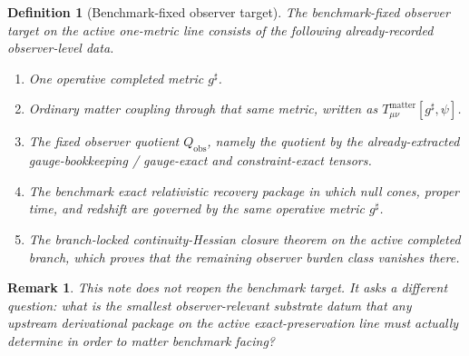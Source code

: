 \documentclass[11pt]{article}
\newcommand{\CompletedMetric}{g^{\sharp}}
\newcommand{\ObserverQuotient}{Q_{\mathrm{obs}}}
\newtheorem{definition}{Definition}
\newtheorem{remark}{Remark}
\begin{document}
\begin{definition}[Benchmark-fixed observer target]
\label{def:target}
The \emph{benchmark-fixed observer target} on the active one-metric line consists of the following already-recorded observer-level data.
\begin{enumerate}
    \item One operative completed metric \(\CompletedMetric\).
    \item Ordinary matter coupling through that same metric, written as \(T_{\mu\nu}^{\mathrm{matter}}[\CompletedMetric,\psi]\).
    \item The fixed observer quotient \(\ObserverQuotient\), namely the quotient by the already-extracted gauge-bookkeeping / gauge-exact and constraint-exact tensors.
    \item The benchmark exact relativistic recovery package in which null cones, proper time, and redshift are governed by the same operative metric \(\CompletedMetric\).
    \item The branch-locked continuity-Hessian closure theorem on the active completed branch, which proves that the remaining observer burden class vanishes there.
\end{enumerate}
\end{definition}

\begin{remark}
This note does not reopen the benchmark target. It asks a different question: what is the smallest observer-relevant substrate datum that any upstream derivational package on the active exact-preservation line must actually determine in order to matter benchmark facing?
\end{remark}
\end{document}
